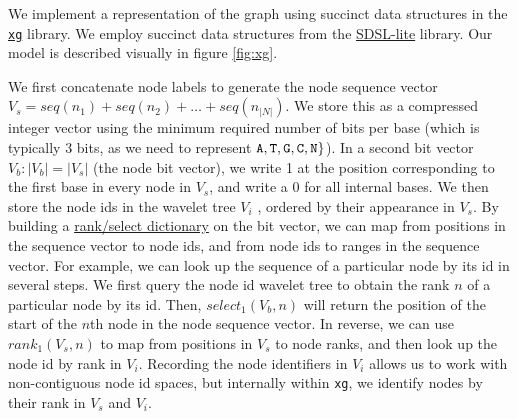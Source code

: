\documentclass{article}
\begin{document}
We implement a representation of the graph using succinct data structures in the \href{https://github.com/vgteam/xg}{{\tt xg}} library.
We employ succinct data structures from the \href{https://github.com/simongog/sdsl-lite}{SDSL-lite} library.
Our model is described visually in figure \ref{fig:xg}.

We first concatenate node labels to generate the node sequence vector $V_s = seq(n_1) + seq(n_2) + \ldots + seq(n_{|N|})$.
We store this as a compressed integer vector using the minimum required number of bits per base (which is typically 3 bits, as we need to represent ${\tt A, T, G, C, N} \}$).
In a second bit vector $V_b : |V_b| = |V_s|$ (the node bit vector), we write 1 at the position corresponding to the first base in every node in $V_s$, and write a 0 for all internal bases.
We then store the node ids in the wavelet tree $V_i$ \cite{grossi2003high}, ordered by their appearance in $V_s$.
By building a \href{https://en.wikipedia.org/wiki/Succinct_data_structure#Succinct_dictionaries}{rank/select dictionary} \cite{okanohara2007} on the bit vector, we can map from positions in the sequence vector to node ids, and from node ids to ranges in the sequence vector.
For example, we can look up the sequence of a particular node by its id in several steps.
We first query the node id wavelet tree to obtain the rank $n$ of a particular node by its id.
Then, $select_1(V_b, n)$ will return the position of the start of the $n$th node in the node sequence vector.
In reverse, we can use $rank_1(V_s, n)$ to map from positions in $V_s$ to node ranks, and then look up the node id by rank in $V_i$.
Recording the node identifiers in $V_i$ allows us to work with non-contiguous node id spaces, but internally within {\tt xg}, we identify nodes by their rank in $V_s$ and $V_i$.
\end{document}
